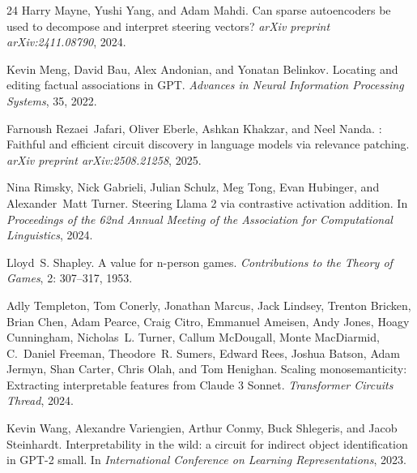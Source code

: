\documentclass[11pt]{article}
\begin{document}
\begin{thebibliography}{24}
Harry Mayne, Yushi Yang, and Adam Mahdi.
\newblock Can sparse autoencoders be used to decompose and interpret steering
  vectors?
\newblock \emph{arXiv preprint arXiv:2411.08790}, 2024.

Kevin Meng, David Bau, Alex Andonian, and Yonatan Belinkov.
\newblock Locating and editing factual associations in {GPT}.
\newblock \emph{Advances in Neural Information Processing Systems}, 35, 2022.

Farnoush Rezaei~Jafari, Oliver Eberle, Ashkan Khakzar, and Neel Nanda.
: Faithful and efficient circuit discovery in language models
  via relevance patching.
\newblock \emph{arXiv preprint arXiv:2508.21258}, 2025.

Nina Rimsky, Nick Gabrieli, Julian Schulz, Meg Tong, Evan Hubinger, and
  Alexander~Matt Turner.
\newblock Steering {Llama} 2 via contrastive activation addition.
\newblock In \emph{Proceedings of the 62nd Annual Meeting of the Association
  for Computational Linguistics}, 2024.

Lloyd~S. Shapley.
\newblock A value for n-person games.
\newblock \emph{Contributions to the Theory of Games}, 2: 307--317,
  1953.

Adly Templeton, Tom Conerly, Jonathan Marcus, Jack Lindsey, Trenton Bricken,
  Brian Chen, Adam Pearce, Craig Citro, Emmanuel Ameisen, Andy Jones, Hoagy
  Cunningham, Nicholas~L. Turner, Callum McDougall, Monte MacDiarmid, C.~Daniel
  Freeman, Theodore~R. Sumers, Edward Rees, Joshua Batson, Adam Jermyn, Shan
  Carter, Chris Olah, and Tom Henighan.
\newblock Scaling monosemanticity: Extracting interpretable features from
  {Claude} 3 {Sonnet}.
\newblock \emph{Transformer Circuits Thread}, 2024.

Kevin Wang, Alexandre Variengien, Arthur Conmy, Buck Shlegeris, and Jacob
  Steinhardt.
\newblock Interpretability in the wild: a circuit for indirect object
  identification in {GPT}-2 small.
\newblock In \emph{International Conference on Learning Representations}, 2023.


\end{thebibliography}
\end{document}

